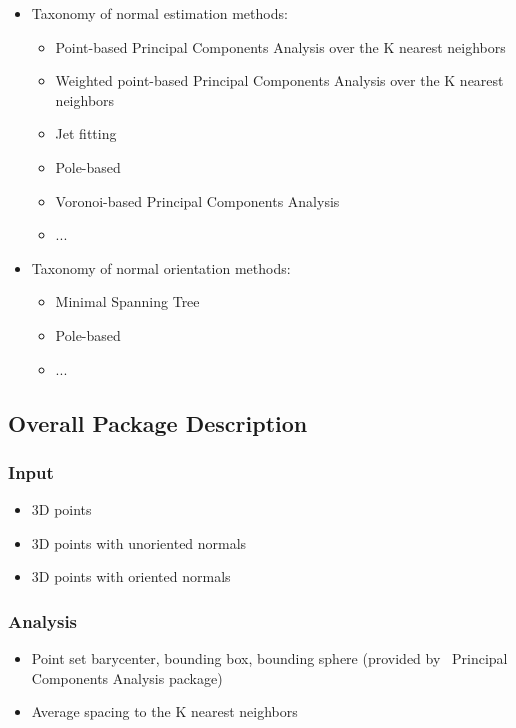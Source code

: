 \begin{itemize}
\item Taxonomy of normal estimation methods:

\begin{itemize}
\item Point-based Principal Components Analysis over the K nearest neighbors
\item Weighted point-based Principal Components Analysis over the K nearest neighbors
\item Jet fitting
\item Pole-based
\item Voronoi-based Principal Components Analysis
\item ...
\end{itemize}

\item Taxonomy of normal orientation methods:

\begin{itemize}
\item Minimal Spanning Tree \cite{cgal:hddms-srup-92}
\item Pole-based \cite{ABK98,BC02}
\item ...
\end{itemize}

\end{itemize}


\subsection{Overall Package Description}

\subsubsection{Input}

\begin{itemize}
\item 3D points
\item 3D points with unoriented normals
\item 3D points with oriented normals
\end{itemize}


\subsubsection{Analysis}

\begin{itemize}
\item Point set barycenter, bounding box, bounding sphere (provided by \cgal\ Principal Components Analysis package)
\item Average spacing to the K nearest neighbors
\end{itemize}


